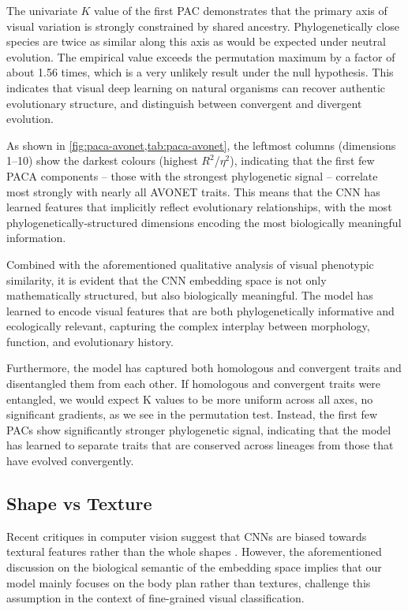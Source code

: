 The univariate $K$ value of the first PAC demonstrates that the primary axis of visual variation is strongly constrained by shared ancestry. 
Phylogenetically close species are twice as similar along this axis as would be expected under neutral evolution. 
The empirical value exceeds the permutation maximum by a factor of about 1.56 times, which is a very unlikely result under the null hypothesis. 
This indicates that visual deep learning on natural organisms can recover authentic evolutionary structure, and distinguish between convergent and divergent evolution.

As shown in \cref{fig:paca-avonet,tab:paca-avonet}, the leftmost columns (dimensions 1--10) show the darkest colours (highest $R^2$/$\eta^2$), indicating that the first few PACA components -- those with the strongest phylogenetic signal -- correlate most strongly with nearly all AVONET traits. This means that the CNN has learned features that implicitly reflect evolutionary relationships, with the most phylogenetically-structured dimensions encoding the most biologically meaningful information. 

Combined with the aforementioned qualitative analysis of visual phenotypic similarity, it is evident that the CNN embedding space is not only mathematically structured, but also biologically meaningful. The model has learned to encode visual features that are both phylogenetically informative and ecologically relevant, capturing the complex interplay between morphology, function, and evolutionary history. 

Furthermore, the model has captured both homologous and convergent traits and disentangled them from each other. 
If homologous and convergent traits were entangled, we would expect K values to be more uniform across all axes, no significant gradients, as we see in the permutation test. Instead, the first few PACs show significantly stronger phylogenetic signal, indicating that the model has learned to separate traits that are conserved across lineages from those that have evolved convergently. 

\subsection{Shape vs Texture}\label{subsec:shape-vs-texture}

Recent critiques in computer vision suggest that CNNs are biased towards
textural features rather than the whole shapes \parencite{Geirhos2018ImagenetTrained}.
However, the aforementioned discussion on the biological semantic of the embedding space implies
that our model mainly focuses on the body plan rather than textures,
challenge this assumption in the context of fine-grained visual classification.

